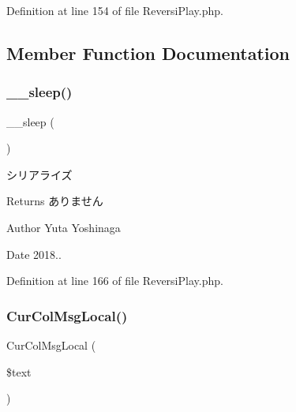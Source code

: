 Definition at line 154 of file Reversi\+Play.\+php.



\subsection{Member Function Documentation}
\mbox{\label{class_reversi_play_aaf11785905da71774e052912d784e3b4}} 
\subsubsection{\texorpdfstring{\+\_\+\+\_\+sleep()}{\_\_sleep()}}
{\footnotesize\ttfamily \+\_\+\+\_\+sleep (\begin{DoxyParamCaption}{ }\end{DoxyParamCaption})}



シリアライズ 

\begin{DoxyReturn}{Returns}
ありません 
\end{DoxyReturn}
\begin{DoxyAuthor}{Author}
Yuta Yoshinaga 
\end{DoxyAuthor}
\begin{DoxyDate}{Date}
2018.. 
\end{DoxyDate}


Definition at line 166 of file Reversi\+Play.\+php.

\mbox{\label{class_reversi_play_aa217a221907e90c97719f8332c60a6d6}} 
\subsubsection{\texorpdfstring{Cur\+Col\+Msg\+Local()}{CurColMsgLocal()}}
{\footnotesize\ttfamily Cur\+Col\+Msg\+Local (\begin{DoxyParamCaption}\item[{}]{\$text }\end{DoxyParamCaption})\hspace{0.3cm}{\ttfamily [private]}}



